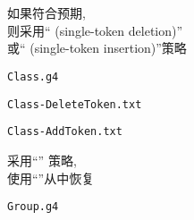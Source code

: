 \begin{frame}{}
  \texttt{\bf {}} \\[20pt]
\end{frame}

\begin{frame}{}
  \texttt{\bf {}} \\[20pt]
\end{frame}

\begin{frame}{}
\end{frame}

\begin{frame}{}
  \begin{center}
    如果符合预期, \\[8pt]
    则采用`` (single-token deletion)'' \\[8pt]
    或`` (single-token insertion)''策略

    \vspace{1.00cm}
    \texttt{Class.g4}
  \end{center}
\end{frame}

\begin{frame}{}
  \begin{center}
    \texttt{Class-DeleteToken.txt}

    \vspace{0.30cm}
  \end{center}
\end{frame}

\begin{frame}{}
  \begin{center}
    \texttt{Class-AddToken.txt}

    \vspace{0.30cm}
  \end{center}
\end{frame}

\begin{frame}{}
  \begin{center}
    采用``'' 策略, \\[5pt]
    使用``''从中恢复

    \vspace{1.00cm}
    \texttt{Group.g4} \\[15pt]
  \end{center}
\end{frame}

